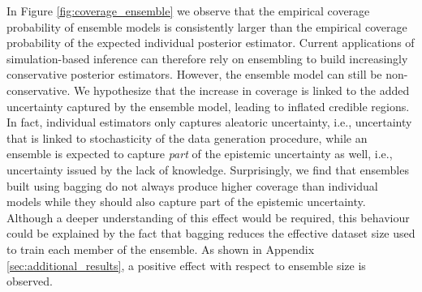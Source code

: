 \documentclass[twoside]{article}
\begin{document}
In Figure \ref{fig:coverage_ensemble} we observe that the empirical coverage probability of ensemble models is consistently larger than the empirical coverage probability of the expected individual posterior estimator. Current applications of simulation-based inference can therefore rely on ensembling to build increasingly conservative posterior estimators. However, the ensemble model can still be non-conservative. We hypothesize that the increase in coverage is linked to the added uncertainty captured by the ensemble model, leading to inflated credible regions. In fact, individual estimators only captures aleatoric uncertainty, i.e., uncertainty that is linked to stochasticity of the data generation procedure, while an ensemble is expected to capture \emph{part} of the epistemic uncertainty as well, i.e., uncertainty issued by the lack of knowledge. Surprisingly, we find that ensembles built using bagging do not always produce higher coverage than individual models while they should also capture part of the epistemic uncertainty. Although a deeper understanding of this effect would be required, this behaviour could be explained by the fact that bagging reduces the effective dataset size used to train each member of the ensemble. As shown in Appendix \ref{sec:additional_results}, a positive effect with respect to ensemble size is observed.
\end{document}
